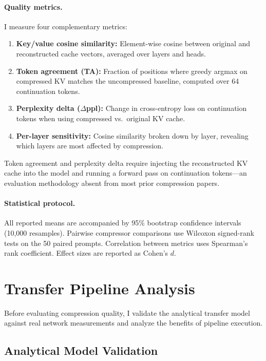 \documentclass{article}
\begin{document}
\paragraph{Quality metrics.} I measure four complementary metrics:
\begin{enumerate}    \item \textbf{Key/value cosine similarity:} Element-wise cosine between original and reconstructed cache vectors, averaged over layers and heads.
    \item \textbf{Token agreement (TA):} Fraction of positions where greedy argmax on compressed KV matches the uncompressed baseline, computed over 64 continuation tokens.
    \item \textbf{Perplexity delta ($\Delta$ppl):} Change in cross-entropy loss on continuation tokens when using compressed vs.\ original KV cache.
    \item \textbf{Per-layer sensitivity:} Cosine similarity broken down by layer, revealing which layers are most affected by compression.
\end{enumerate}
Token agreement and perplexity delta require injecting the reconstructed KV cache into the model and running a forward pass on continuation tokens---an evaluation methodology absent from most prior compression papers.

\paragraph{Statistical protocol.} All reported means are accompanied by 95\% bootstrap confidence intervals (10{,}000 resamples). Pairwise compressor comparisons use Wilcoxon signed-rank tests on the 50 paired prompts. Correlation between metrics uses Spearman's rank coefficient. Effect sizes are reported as Cohen's $d$.

\section{Transfer Pipeline Analysis}
\label{sec:pipeline}

Before evaluating compression quality, I validate the analytical transfer model against real network measurements and analyze the benefits of pipeline execution.

\subsection{Analytical Model Validation}
\end{document}

